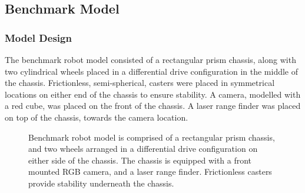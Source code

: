 \documentclass[a4paper]{article}
\begin{document}
\subsection{Benchmark Model}
\subsubsection{Model Design}
The benchmark robot model consisted of a rectangular prism chassis, along with two cylindrical wheels placed in a differential drive configuration in the middle of the chassis. Frictionless, semi-spherical, casters were placed in symmetrical locations on either end of the chassis to ensure stability. A camera, modelled with a red cube, was placed on the front of the chassis. A laser range finder was placed on top of the chassis, towards the camera location.
\begin{figure}[h]
\centering
{}
\caption{Benchmark robot model is comprised of a rectangular prism chassis, and two wheels arranged in a differential drive configuration on either side of the chassis. The chassis is equipped with a front mounted RGB camera, and a laser range finder. Frictionless casters provide stability underneath the chassis.}
\end{figure}
\end{document}
